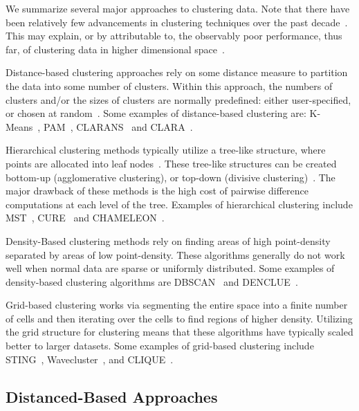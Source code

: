 We summarize several major approaches to clustering data.
Note that there have been relatively few advancements in clustering techniques over the past decade~\cite{wang_progress_2019}. This may explain, or by attributable to, the observably poor performance, thus far, of clustering data in higher dimensional space~\cite{zhang_advancements_2013}.

Distance-based clustering approaches rely on some distance measure to partition the data into some number of clusters.
Within this approach, the numbers of clusters and/or the sizes of clusters are normally predefined: either user-specified, or chosen at random~\cite{wang_progress_2019}.
Some examples of distance-based clustering are:
K-Means~\cite{macqueen1967some}, 
PAM~\cite{kaufman2009finding}, 
CLARANS~\cite{ng1994efficient} and
CLARA~\cite{kaufman2009finding}.

Hierarchical clustering methods typically utilize a tree-like structure, where points are allocated into leaf nodes~\cite{wang_progress_2019}.
These tree-like structures can be created bottom-up (agglomerative clustering), or top-down (divisive clustering)~\cite{rakesh_agrawal_automatic_1998}.
The major drawback of these methods is the high cost of pairwise difference computations at each level of the tree.
Examples of hierarchical clustering include 
MST~\cite{charles_zahn_graph_1971}, 
CURE~\cite{guha1998cure} and
CHAMELEON~\cite{karypis_chameleon:_nodate}.

Density-Based clustering methods rely on finding areas of high point-density separated by areas of low point-density.
These algorithms generally do not work well when normal data are sparse or uniformly distributed.
Some examples of density-based clustering algorithms are
DBSCAN~\cite{ester_density-based_nodate} and
DENCLUE~\cite{Hinneburg1998Effic-5816}.

Grid-based clustering works via segmenting the entire space into a finite number of cells and then iterating over the cells to find regions of higher density.
Utilizing the grid structure for clustering means that these algorithms have typically scaled better to larger datasets.
Some examples of grid-based clustering include
STING~\cite{sting:wang}, 
Wavecluster~\cite{Wavecluster:Sheikholeslami:2000}, and
CLIQUE~\cite{rakesh_agrawal_automatic_1998}.

\subsection{Distanced-Based Approaches}


